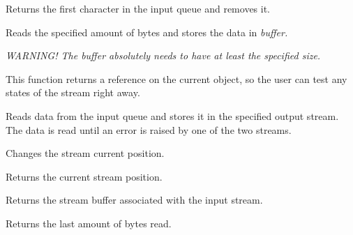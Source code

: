 
Returns the first character in the input queue and removes it.



Reads the specified amount of bytes and stores the data in \it{buffer}.

\it{WARNING!} The buffer absolutely needs to have at least the specified size.

This function returns a reference on the current object, so the user can test
any states of the stream right away.


Reads data from the input queue and stores it in the specified output stream.
The data is read until an error is raised by one of the two streams.



Changes the stream current position.



Returns the current stream position.



Returns the stream buffer associated with the input stream.



Returns the last amount of bytes read.

\section{}\label{wxoutputstream}

